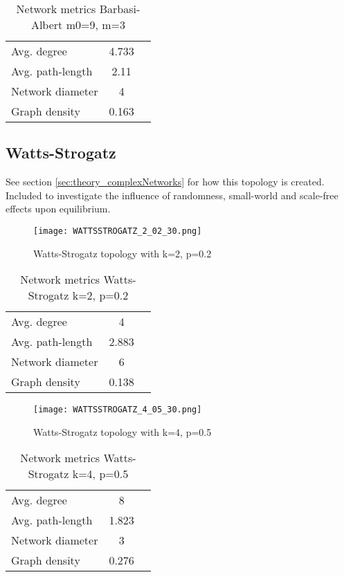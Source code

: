 \documentclass[Bachelorarbeit.tex]{subfiles}
\begin{document}
\begin{table}[H]
	\centering
	\caption{Network metrics Barbasi-Albert m0=9, m=3}
	\begin{tabular} { l c r }
		\hline
		Avg. degree & 4.733 \\
		Avg. path-length & 2.11 \\
		Network diameter & 4 \\
		Graph density & 0.163 \\
		\hline
	\end{tabular}
\end{table}

\subsection{Watts-Strogatz}
See section \ref{sec:theory_complexNetworks} for how this topology is created.
\medskip
Included to investigate the influence of randomness, small-world and scale-free effects upon equilibrium.

\begin{figure}[H]
	\centering
  \texttt{[image: WATTSSTROGATZ\_2\_02\_30.png]}
	\caption{Watts-Strogatz topology with k=2, p=0.2}
	\label{fig:topology_WATTSSTROGATZ_2_02_30}
\end{figure}

\begin{table}[H]
	\centering
	\caption{Network metrics Watts-Strogatz k=2, p=0.2}
	\begin{tabular} { l c r }
		\hline
		Avg. degree & 4 \\
		Avg. path-length & 2.883 \\
		Network diameter & 6 \\
		Graph density & 0.138 \\
		\hline
	\end{tabular}
\end{table}

\begin{figure}[H]
	\centering
  \texttt{[image: WATTSSTROGATZ\_4\_05\_30.png]}
	\caption{Watts-Strogatz topology with k=4, p=0.5}
	\label{fig:topology_WATTSSTROGATZ_4_05_30}
\end{figure}

\begin{table}[h]
	\centering
	\caption{Network metrics Watts-Strogatz k=4, p=0.5}
	\begin{tabular} { l c r }
		\hline
		Avg. degree & 8 \\
		Avg. path-length & 1.823 \\
		Network diameter & 3 \\
		Graph density & 0.276 \\
		\hline
	\end{tabular}
\end{table}
\end{document}
